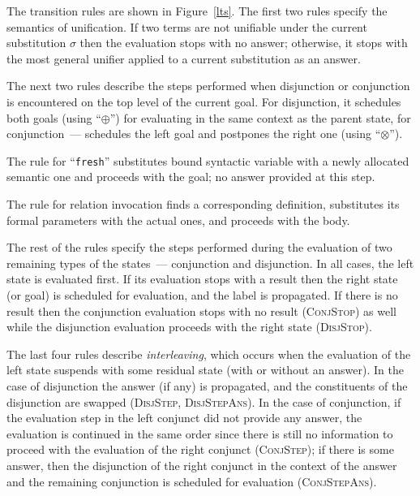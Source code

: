 The transition rules are shown in Figure~\ref{lts}. The first two rules specify the semantics of unification. If two terms are not unifiable under the current substitution
$\sigma$ then the evaluation stops with no answer; otherwise, it stops with the most general unifier applied to a current substitution as an answer.

The next two rules describe the steps performed when disjunction or conjunction is encountered on the top level of the current goal. For disjunction, it schedules both goals (using ``$\oplus$'') for
evaluating in the same context as the parent state, for conjunction~--- schedules the left goal and postpones the right one (using ``$\otimes$'').

The rule for ``\lstinline|fresh|'' substitutes bound syntactic variable with a newly allocated semantic one and proceeds with the goal; no answer provided at this step.

The rule for relation invocation finds a corresponding definition, substitutes its formal parameters with the actual ones, and proceeds with the body.

The rest of the rules specify the steps performed during the evaluation of two remaining types of the states~--- conjunction and disjunction. In all cases, the left state
is evaluated first. If its evaluation stops with a result then the right state (or goal) is scheduled for evaluation, and the label is propagated. If there is no result then
the conjunction evaluation stops with no result (\textsc{ConjStop}) as well while the disjunction evaluation proceeds with the right state (\textsc{DisjStop}).

The last four rules describe \emph{interleaving}, which occurs when the evaluation of the left state suspends with some residual state (with or without an answer). In the case of disjunction
the answer (if any) is propagated, and the constituents of the disjunction are swapped (\textsc{DisjStep}, \textsc{DisjStepAns}). In the case of conjunction, if the evaluation step in
the left conjunct did not provide any answer, the evaluation is continued in the same order since there is still no information to proceed with the evaluation of the right
conjunct (\textsc{ConjStep}); if there is some answer, then the disjunction of the right conjunct in the context of the answer and the remaining conjunction is
scheduled for evaluation (\textsc{ConjStepAns}).

